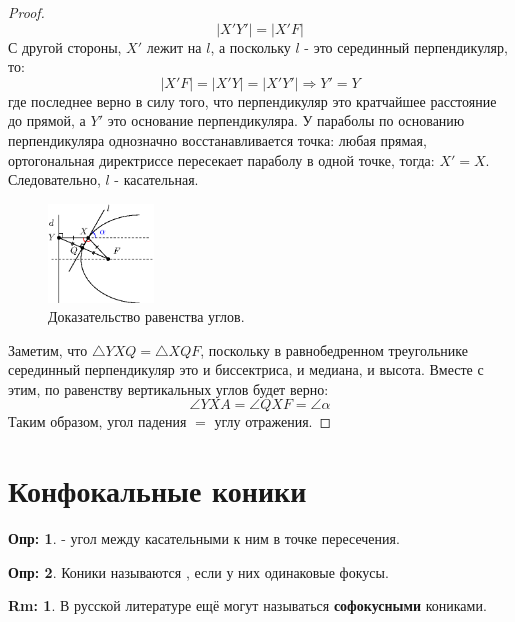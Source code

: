 \documentclass[12pt]{article}
\theoremstyle{definition}
\newtheorem{defn}{Опр:}
\newtheorem{rem}{Rm:}
\begin{document}
\begin{proof}
	$$
		|X'Y'| = |X'F| 
	$$
	С другой стороны, $X'$ лежит на $l$, а поскольку $l$ - это серединный перпендикуляр, то:
	$$
		|X'F| = |X'Y| = |X'Y'| \Rightarrow Y' = Y
	$$
	где последнее верно в силу того, что перпендикуляр это кратчайшее расстояние до прямой, а $Y'$ это основание перпендикуляра. У параболы по основанию перпендикуляра однозначно восстанавливается точка: любая прямая, ортогональная директриссе пересекает параболу в одной точке, тогда: $X' = X$. Следовательно, $l$ - касательная.
	\begin{figure}[H]
		\centering
		\includegraphics[width=0.25\textwidth]{ANGL2_15.eps}
		\caption{Доказательство равенства углов.}
		\label{2_15}
	\end{figure}
	Заметим, что $\triangle YXQ = \triangle XQF$, поскольку в равнобедренном треугольнике серединный перпендикуляр это и биссектриса, и медиана, и высота. Вместе с этим, по равенству вертикальных углов будет верно: 
	$$
		\angle YXA = \angle QXF = \angle \alpha
	$$
	Таким образом, угол падения $=$ углу отражения.
\end{proof}

\section*{Конфокальные коники}

\begin{defn}
	 - угол между касательными к ним в точке пересечения.
\end{defn}

\begin{defn}
Коники называются , если у них одинаковые фокусы.
\end{defn}
\begin{rem}
	В русской литературе ещё могут называться \textbf{софокусными} кониками.
\end{rem}
\end{document}
